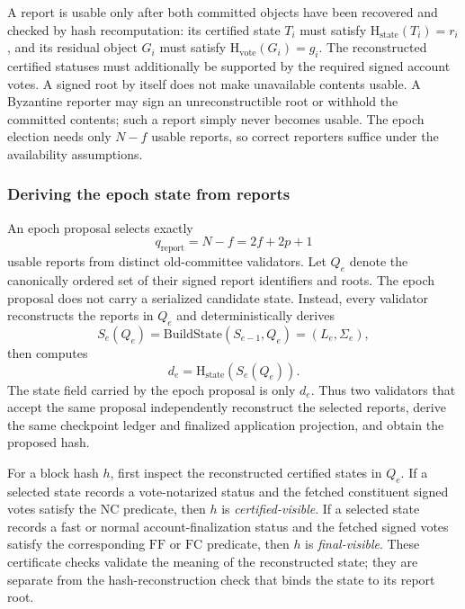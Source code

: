 \documentclass[10pt,twocolumn]{article}
\newcommand{\NC}{\mathrm{NC}}
\newcommand{\FC}{\mathrm{FC}}
\newcommand{\FF}{\mathrm{FF}}
\newcommand{\StateHash}{\mathrm{H}_{\mathrm{state}}}
\newcommand{\VoteHash}{\mathrm{H}_{\mathrm{vote}}}
\newcommand{\BuildState}{\mathrm{BuildState}}
\begin{document}
A report is usable only after both committed objects have been recovered and checked by hash recomputation: its certified state $T_i$ must satisfy $\StateHash(T_i)=r_i$, and its residual object $G_i$ must satisfy $\VoteHash(G_i)=g_i$. The reconstructed certified statuses must additionally be supported by the required signed account votes. A signed root by itself does not make unavailable contents usable. A Byzantine reporter may sign an unreconstructible root or withhold the committed contents; such a report simply never becomes usable. The epoch election needs only $N-f$ usable reports, so correct reporters suffice under the availability assumptions.

\subsubsection{Deriving the epoch state from reports}
An epoch proposal selects exactly
\begin{equation}
q_{\mathrm{report}}=N-f=2f+2p+1
\end{equation}
usable reports from distinct old-committee validators. Let $Q_e$ denote the canonically ordered set of their signed report identifiers and roots. The epoch proposal does not carry a serialized candidate state. Instead, every validator reconstructs the reports in $Q_e$ and deterministically derives
\begin{equation}
S_e(Q_e)=\BuildState(S_{e-1},Q_e)=(L_e,\Sigma_e),
\end{equation}
then computes
\begin{equation}
d_e=\StateHash(S_e(Q_e)).
\end{equation}
The state field carried by the epoch proposal is only $d_e$. Thus two validators that accept the same proposal independently reconstruct the selected reports, derive the same checkpoint ledger and finalized application projection, and obtain the proposed hash.

For a block hash $h$, first inspect the reconstructed certified states in $Q_e$. If a selected state records a vote-notarized status and the fetched constituent signed votes satisfy the $\NC$ predicate, then $h$ is \emph{certified-visible}. If a selected state records a fast or normal account-finalization status and the fetched signed votes satisfy the corresponding $\FF$ or $\FC$ predicate, then $h$ is \emph{final-visible}. These certificate checks validate the meaning of the reconstructed state; they are separate from the hash-reconstruction check that binds the state to its report root.
\end{document}
